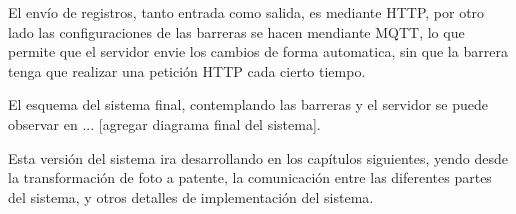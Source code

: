El envío de registros, tanto entrada como salida, es mediante HTTP, por otro lado las configuraciones de las barreras se hacen mendiante MQTT, lo que permite que el servidor envie los cambios de forma automatica, sin que la barrera tenga que realizar una petición HTTP cada cierto tiempo.

El esquema del sistema final, contemplando las barreras y el servidor se puede observar en ... [agregar diagrama final del sistema].

Esta versión del sistema ira desarrollando en los capítulos siguientes, yendo desde la transformación de foto a patente, la comunicación entre las diferentes partes del sistema, y otros detalles de implementación del sistema.